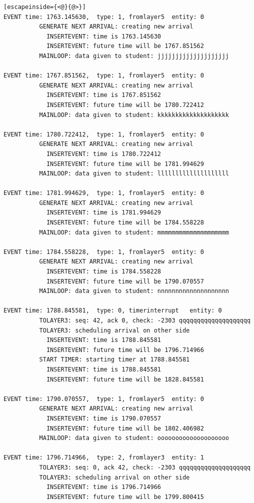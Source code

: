 \documentclass[paper=a4, fontsize=11pt]{scrartcl}
\numberwithin{equation}{section}		%
\numberwithin{figure}{section}			%
\numberwithin{table}{section}				%
\begin{document}
\begin{lstlisting}[escapeinside={<@}{@>}]
EVENT time: 1763.145630,  type: 1, fromlayer5  entity: 0
          GENERATE NEXT ARRIVAL: creating new arrival
            INSERTEVENT: time is 1763.145630
            INSERTEVENT: future time will be 1767.851562
          MAINLOOP: data given to student: jjjjjjjjjjjjjjjjjjjj

EVENT time: 1767.851562,  type: 1, fromlayer5  entity: 0
          GENERATE NEXT ARRIVAL: creating new arrival
            INSERTEVENT: time is 1767.851562
            INSERTEVENT: future time will be 1780.722412
          MAINLOOP: data given to student: kkkkkkkkkkkkkkkkkkkk

EVENT time: 1780.722412,  type: 1, fromlayer5  entity: 0
          GENERATE NEXT ARRIVAL: creating new arrival
            INSERTEVENT: time is 1780.722412
            INSERTEVENT: future time will be 1781.994629
          MAINLOOP: data given to student: llllllllllllllllllll

EVENT time: 1781.994629,  type: 1, fromlayer5  entity: 0
          GENERATE NEXT ARRIVAL: creating new arrival
            INSERTEVENT: time is 1781.994629
            INSERTEVENT: future time will be 1784.558228
          MAINLOOP: data given to student: mmmmmmmmmmmmmmmmmmmm

EVENT time: 1784.558228,  type: 1, fromlayer5  entity: 0
          GENERATE NEXT ARRIVAL: creating new arrival
            INSERTEVENT: time is 1784.558228
            INSERTEVENT: future time will be 1790.070557
          MAINLOOP: data given to student: nnnnnnnnnnnnnnnnnnnn

EVENT time: 1788.845581,  type: 0, timerinterrupt   entity: 0
          TOLAYER3: seq: 42, ack 0, check: -2303 qqqqqqqqqqqqqqqqqqqq
          TOLAYER3: scheduling arrival on other side
            INSERTEVENT: time is 1788.845581
            INSERTEVENT: future time will be 1796.714966
          START TIMER: starting timer at 1788.845581
            INSERTEVENT: time is 1788.845581
            INSERTEVENT: future time will be 1828.845581

EVENT time: 1790.070557,  type: 1, fromlayer5  entity: 0
          GENERATE NEXT ARRIVAL: creating new arrival
            INSERTEVENT: time is 1790.070557
            INSERTEVENT: future time will be 1802.406982
          MAINLOOP: data given to student: oooooooooooooooooooo

EVENT time: 1796.714966,  type: 2, fromlayer3  entity: 1
          TOLAYER3: seq: 0, ack 42, check: -2303 qqqqqqqqqqqqqqqqqqqq
          TOLAYER3: scheduling arrival on other side
            INSERTEVENT: time is 1796.714966
            INSERTEVENT: future time will be 1799.800415


\end{lstlisting}
\end{document}

